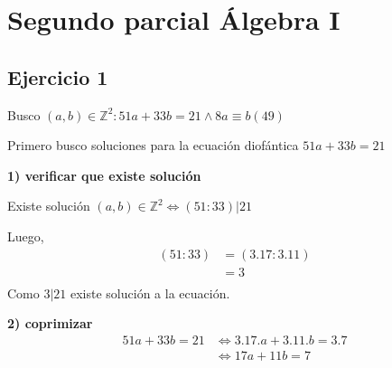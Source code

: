 
\usepackage{caratula}
\usepackage{enumerate}
\usepackage{hyperref}
\usepackage{graphicx}
\usepackage{amsfonts}
\usepackage{enumitem}
\usepackage{amsmath}

\decimalpoint
\hypersetup{colorlinks=true, linkcolor=black, urlcolor=blue}
\setlength{\parindent}{0em}
\setlength{\parskip}{0.5em}
\setcounter{tocdepth}{3} %
\setcounter{section}{1} %
\renewcommand{\thesubsubsection}{\thesubsection.\Alph{subsubsection}}
\graphicspath{ {images/} }





\maketitle
\newpage

\tableofcontents
\newpage

\section{Segundo parcial Álgebra I}
\subsection{Ejercicio 1}

Busco $ (a,b) \in \mathbb{Z}^2: 51a+33b = 21 \wedge 8a \equiv b(49) $

Primero busco soluciones para la ecuación diofántica $ 51a+33b = 21 $

\textbf{1) verificar que existe solución}

Existe solución $ (a,b) \in \mathbb{Z}^2 \iff (51:33) | 21 $

Luego,
\begin{align*}
    (51:33) &= (3.17: 3.11) \\
    &= 3 \\
\end{align*}
Como $ 3|21 $ existe solución a la ecuación.

\textbf{2) coprimizar}
\begin{align*}
    51a+33b = 21 &\iff 3.17.a + 3.11.b = 3.7 \\
    &\iff 17a + 11b = 7 \\
\end{align*}

